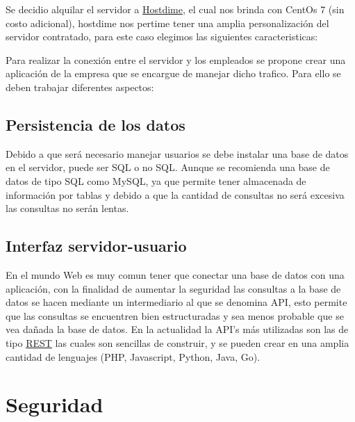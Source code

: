 \documentclass[11pt]{article}
\begin{document}
        Se decidio alquilar el servidor a \href{https://www.hostdime.com.ar/}{Hostdime}, el cual nos brinda con CentOs 7 (sin costo adicional), 
        hostdime nos pertime tener una amplia personalización del servidor contratado, para este caso elegimos las siguientes caracteristicas: 

        \begin{table}[H]
            \centering
            
        \end{table}

        Para realizar la conexión entre el servidor y los empleados se propone crear una aplicación de la empresa que se encargue de manejar dicho trafico. 
        Para ello se deben trabajar diferentes aspectos: 

        \subsection{Persistencia de los datos}

        Debido a que será necesario manejar usuarios se debe instalar una base de datos en el servidor, puede ser SQL o no SQL.
        Aunque se recomienda una base de datos de tipo SQL como MySQL, ya que permite tener almacenada de información por tablas 
        y debido a que la cantidad de consultas no será excesiva las consultas no serán lentas. 

        \subsection{Interfaz servidor-usuario}

        En el mundo Web es muy comun tener que conectar una base de datos con una aplicación, con la finalidad de aumentar la seguridad las 
        consultas a la base de datos se hacen mediante un intermediario al que se denomina API, esto permite que las consultas 
        se encuentren bien estructuradas y sea menos probable que se vea dañada la base de datos. En la actualidad la API's más utilizadas son 
        las de tipo \href{https://rockcontent.com/es/blog/api-rest/#:~:text=Antes%20de%20introducir%20el%20concepto,comunicaci%C3%B3n%20de%20datos%20entre%20aplicaciones.}{REST} las cuales son sencillas de construir, y se pueden crear en una amplia cantidad de lenguajes (PHP, Javascript, Python, Java, Go).

    

    \section{Seguridad}
    
\end{document}
